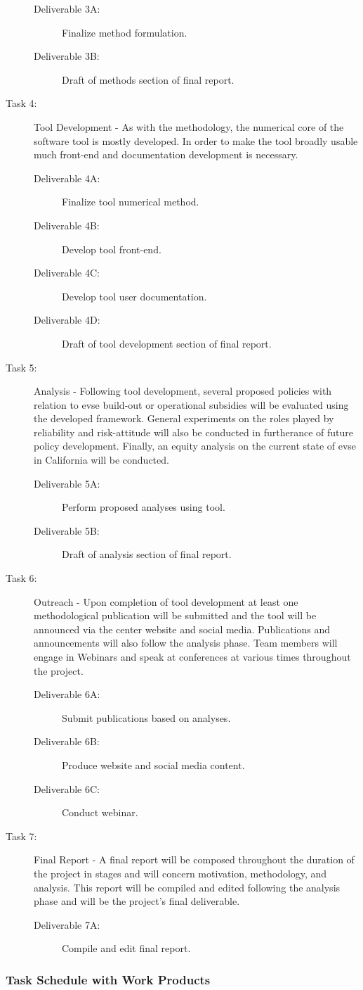 \documentclass[12pt]{article}
\begin{document}
\begin{description}
\begin{description}
		\item[Deliverable 3A:] Finalize method formulation.
		\item[Deliverable 3B:] Draft of methods section of final report.
	\end{description}
	\item[Task 4:] Tool Development - As with the methodology, the numerical core of the software tool is mostly developed. In order to make the tool broadly usable much front-end and documentation development is necessary.
	\begin{description}
		\item[Deliverable 4A:] Finalize tool numerical method.
		\item[Deliverable 4B:] Develop tool front-end.
		\item[Deliverable 4C:] Develop tool user documentation.
		\item[Deliverable 4D:] Draft of tool development section of final report.
	\end{description}
	\item[Task 5:] Analysis - Following tool development, several proposed policies with relation to \gls{evse} build-out or operational subsidies will be evaluated using the developed framework. General experiments on the roles played by reliability and risk-attitude will also be conducted in furtherance of future policy development. Finally, an equity analysis on the current state of \gls{evse} in California will be conducted.
	\begin{description}
		\item[Deliverable 5A:] Perform proposed analyses using tool.
		\item[Deliverable 5B:] Draft of analysis section of final report.
	\end{description}
	\item[Task 6:] Outreach - Upon completion of tool development at least one methodological publication will be submitted and the tool will be announced via the center website and social media. Publications and announcements will also follow the analysis phase. Team members will engage in Webinars and speak at conferences at various times throughout the project.
	\begin{description}
		\item[Deliverable 6A:] Submit publications based on analyses.
		\item[Deliverable 6B:] Produce website and social media content.
		\item[Deliverable 6C:] Conduct webinar.
	\end{description}
	\item[Task 7:] Final Report - A final report will be composed throughout the duration of the project in stages and will concern motivation, methodology, and analysis. This report will be compiled and edited following the analysis phase and will be the project's final deliverable.
	\begin{description}
		\item[Deliverable 7A:] Compile and edit final report.
	\end{description}
\end{description}

\subsubsection*{Task Schedule with Work Products}

\printbibliography
\end{document}
